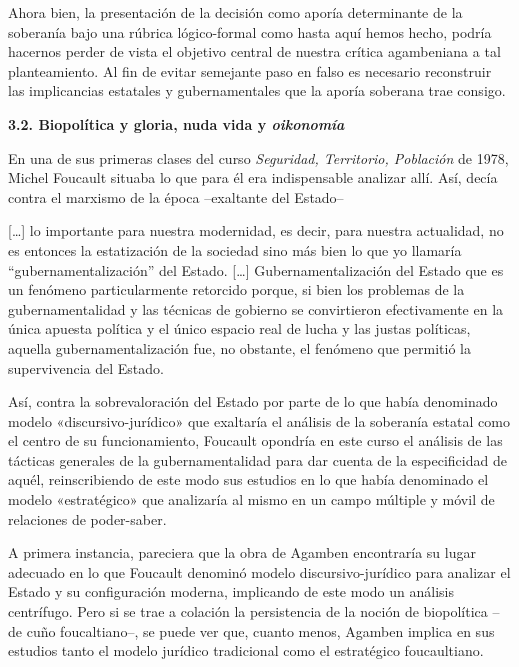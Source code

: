 Ahora bien, la presentación de la decisión como aporía determinante de la soberanía bajo una rúbrica lógico-formal como hasta aquí hemos hecho, podría hacernos perder de vista el objetivo central de nuestra crítica agambeniana a tal planteamiento. Al fin de evitar semejante paso en falso es necesario reconstruir las implicancias estatales y gubernamentales que la aporía soberana trae consigo.

\textbf{3.2. Biopolítica y gloria, nuda vida y \emph{oikonom}\emph{í}\emph{a}}

En una de sus primeras clases del curso \emph{Seguridad, Territorio, Población} de 1978, Michel Foucault situaba lo que para él era indispensable analizar allí. Así, decía contra el marxismo de la época --exaltante del Estado--

{[}\ldots{]} lo importante para nuestra modernidad, es decir, para nuestra actualidad, no es entonces la estatización de la sociedad sino más bien lo que yo llamaría ``gubernamentalización'' del Estado. {[}\ldots{]} Gubernamentalización del Estado que es un fenómeno particularmente retorcido porque, si bien los problemas de la gubernamentalidad y las técnicas de gobierno se convirtieron efectivamente en la única apuesta política y el único espacio real de lucha y las justas políticas, aquella gubernamentalización fue, no obstante, el fenómeno que permitió la supervivencia del Estado.

Así, contra la sobrevaloración del Estado por parte de lo que había denominado modelo «discursivo-jurídico» que exaltaría el análisis de la soberanía estatal como el centro de su funcionamiento, Foucault opondría en este curso el análisis de las tácticas generales de la gubernamentalidad para dar cuenta de la especificidad de aquél, reinscribiendo de este modo sus estudios en lo que había denominado el modelo «estratégico» que analizaría al mismo en un campo múltiple y móvil de relaciones de poder-saber.

A primera instancia, pareciera que la obra de Agamben encontraría su lugar adecuado en lo que Foucault denominó modelo discursivo-jurídico para analizar el Estado y su configuración moderna, implicando de este modo un análisis centrífugo. Pero si se trae a colación la persistencia de la noción de biopolítica --de cuño foucaltiano--, se puede ver que, cuanto menos, Agamben implica en sus estudios tanto el modelo jurídico tradicional como el estratégico foucaultiano.

